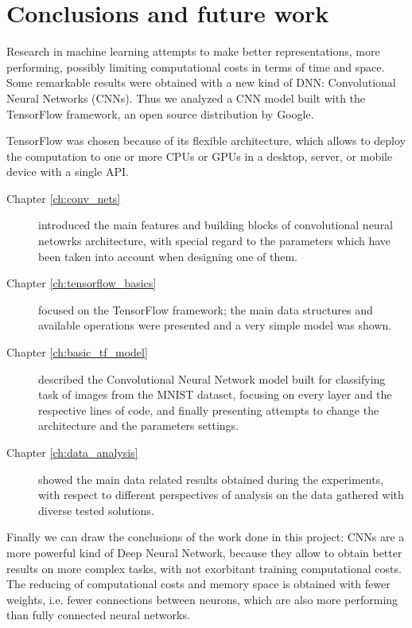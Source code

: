 \chapter{Conclusions and future work}\label{ch:conclusions}

Research in machine learning attempts to make better representations, more performing, possibly limiting computational costs in terms of time and space. Some remarkable results were obtained with a new kind of \acs{DNN}: Convolutional Neural Networks (\acsp{CNN}). Thus we analyzed a \acs{CNN} model built with the TensorFlow framework, an open source distribution by Google.

TensorFlow was chosen because of its flexible architecture, which allows to deploy the computation to one or more \acsp{CPU} or \acsp{GPU} in a desktop, server, or mobile device with a single API.

\begin{description}
	\item[Chapter \ref{ch:conv_nets}] introduced the main features and building blocks of convolutional neural netowrks architecture, with special regard to the parameters which have been taken into account when designing one of them.
	
	\item[Chapter \ref{ch:tensorflow_basics}] focused on the TensorFlow framework; the main data structures and available operations were presented and a very simple model was shown.
	
	\item[Chapter \ref{ch:basic_tf_model}] described the Convolutional Neural Network model built for classifying task of images from the \acs{MNIST} dataset, focusing on every layer and the respective lines of code, and finally presenting attempts to change the architecture and the parameters settings.
	
	\item[Chapter \ref{ch:data_analysis}] showed the main data related results obtained during the experiments, with respect to different perspectives of analysis on the data gathered with diverse tested solutions.
\end{description}

Finally we can draw the conclusions of the work done in this project: \acsp{CNN} are a more powerful kind of Deep Neural Network, because they allow to obtain better results on more complex tasks, with not exorbitant training computational costs. The reducing of computational costs and memory space is obtained with fewer weights, i.e. fewer connections between neurons, which are also more performing than fully connected neural networks.

